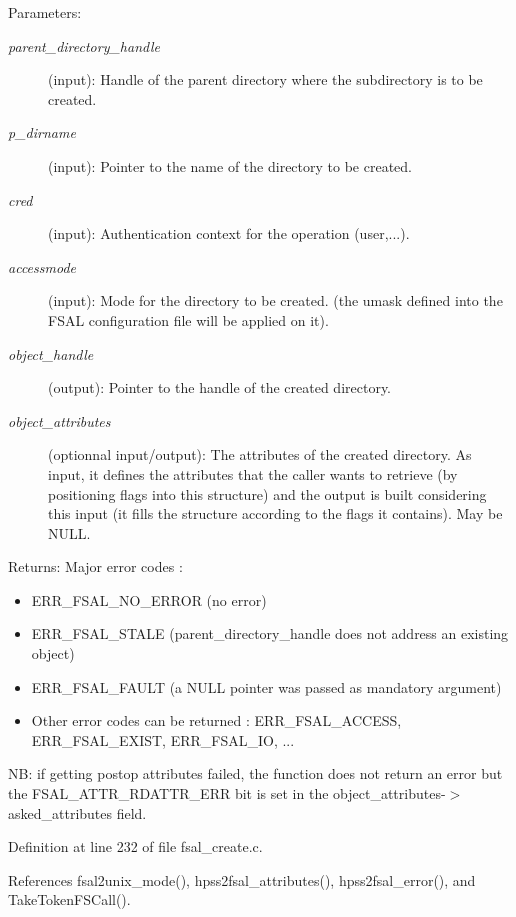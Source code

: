 \begin{Desc}
\item[Parameters:]
\begin{description}
\item[{\em parent\_\-directory\_\-handle}](input): Handle of the parent directory where the subdirectory is to be created. \item[{\em p\_\-dirname}](input): Pointer to the name of the directory to be created. \item[{\em cred}](input): Authentication context for the operation (user,...). \item[{\em accessmode}](input): Mode for the directory to be created. (the umask defined into the FSAL configuration file will be applied on it). \item[{\em object\_\-handle}](output): Pointer to the handle of the created directory. \item[{\em object\_\-attributes}](optionnal input/output): The attributes of the created directory. As input, it defines the attributes that the caller wants to retrieve (by positioning flags into this structure) and the output is built considering this input (it fills the structure according to the flags it contains). May be NULL.\end{description}
\end{Desc}
\begin{Desc}
\item[Returns:]Major error codes :\begin{itemize}
\item ERR\_\-FSAL\_\-NO\_\-ERROR (no error)\item ERR\_\-FSAL\_\-STALE (parent\_\-directory\_\-handle does not address an existing object)\item ERR\_\-FSAL\_\-FAULT (a NULL pointer was passed as mandatory argument)\item Other error codes can be returned : ERR\_\-FSAL\_\-ACCESS, ERR\_\-FSAL\_\-EXIST, ERR\_\-FSAL\_\-IO, ...\end{itemize}
\end{Desc}
NB: if getting postop attributes failed, the function does not return an error but the FSAL\_\-ATTR\_\-RDATTR\_\-ERR bit is set in the object\_\-attributes-$>$asked\_\-attributes field. 

Definition at line 232 of file fsal\_\-create.c.

References fsal2unix\_\-mode(), hpss2fsal\_\-attributes(), hpss2fsal\_\-error(), and TakeTokenFSCall().
